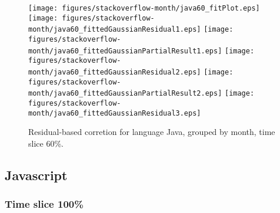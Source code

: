 \begin{figure}[hb]
\centering
{}
{\texttt{[image: figures/stackoverflow-month/java60\_fitPlot.eps]}}
{\texttt{[image: figures/stackoverflow-month/java60\_fittedGaussianResidual1.eps]}}
{\texttt{[image: figures/stackoverflow-month/java60\_fittedGaussianPartialResult1.eps]}}
{\texttt{[image: figures/stackoverflow-month/java60\_fittedGaussianResidual2.eps]}}
{\texttt{[image: figures/stackoverflow-month/java60\_fittedGaussianPartialResult2.eps]}}
{\texttt{[image: figures/stackoverflow-month/java60\_fittedGaussianResidual3.eps]}}
\caption{Residual-based corretion for language Java, grouped by month, time slice 60\%.}
\end{figure}


\clearpage 
\newpage 


\subsection{Javascript}

\FloatBarrier

\subsubsection{Time slice 100\%}

